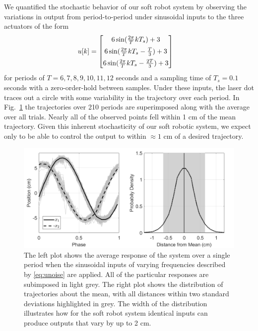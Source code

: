 We quantified the stochastic behavior of our soft robot system by observing the variations in output from period-to-period under sinusoidal inputs to the three actuators of the form
\begin{align} 
    u[k] &= \begin{bmatrix} 6 \sin ( \frac{2 \pi}{T} k T_s ) + 3 \vspace{5pt} \\ 
    6 \sin ( \frac{2 \pi}{T} k T_s - \frac{T}{3} ) + 3 \vspace{5pt} \\ 
    6 \sin ( \frac{2 \pi}{T} k T_s  - \frac{2T}{3}) + 3\end{bmatrix}
    \label{eq:unoise}
\end{align}
for periods of $T = 6,7,8,9,10,11,12$ seconds and a sampling time of $T_s = 0.1$ seconds with a zero-order-hold between samples. 
Under these inputs, the laser dot traces out a circle with some variability in the trajectory over each period.
In Fig.~\ref{fig:noise} the trajectories over 210 periods are superimposed along with the average over all trials.
Nearly all of the observed points fell within 1 cm of the mean trajectory.
Given this inherent stochasticity of our soft robotic system, we expect only to be able to control the output to within $\approx 1$ cm of a desired trajectory.

\begin{figure}
    \centering
    \includegraphics[width=\linewidth]{figures/noise.png}
    \caption{The left plot shows the average response of the system over a single period when the sinusoidal inputs of varying frequencies described by \eqref{eq:unoise} are applied. All of the particular responses are subimposed in light grey.
    The right plot shows the distribution of trajectories about the mean, with all distances within two standard deviations highlighted in grey. The width of the distribution illustrates how for the soft robot system identical inputs can produce outputs that vary by up to 2 cm.}
    \label{fig:noise}
    \vspace*{-0.5cm}
\end{figure}

